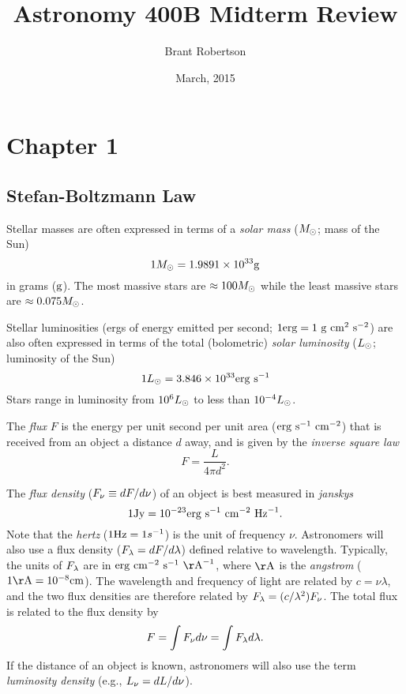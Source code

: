 \documentclass[]{article}
\title{Astronomy 400B Midterm Review}
\author{Brant Robertson}
\date{March, 2015}
\begin{document}
\maketitle

\section{Chapter 1}

\subsection{Stefan-Boltzmann Law}

Stellar masses are often expressed in terms of a {\it solar mass} ($M_{\odot}$; mass of the Sun)
\begin{equation}
1M_{\odot} = 1.9891\times10^{33}\mathrm{g}
\end{equation}
\noindent
in grams ($\mathrm{g}$). The most massive stars are $\approx100M_{\odot}$ while the
least massive stars are $\approx0.075M_{\odot}$.

Stellar luminosities (ergs of energy emitted per second; $1\mathrm{erg} = 1~\mathrm{g}~\mathrm{cm}^{2}~\mathrm{s}^{-2}$) are also 
often expressed in terms of the total (bolometric) {\it solar luminosity} ($L_{\odot}$; luminosity of the Sun)
\begin{equation}
1L_{\odot} = 3.846\times10^{33} \mathrm{erg}~\mathrm{s}^{-1}
\end{equation}
\noindent
Stars range in luminosity from $10^{6}L_{\odot}$ to less than $10^{-4}L_{\odot}$.

The {\it flux} $F$ is the energy per unit second per unit area ($\mathrm{erg}~\mathrm{s}^{-1}~\mathrm{cm}^{-2}$)
that is received from an object a distance $d$ away, and is
given by the {\it inverse square law}
\begin{equation}
\label{eqn:inverse_square}
F = \frac{L}{4\pi d^{2}}.
\end{equation}
\noindent

The {\it flux density} ($F_{\nu} \equiv dF/d\nu$) of an object is best measured in {\it janskys}
\begin{equation}
1\mathrm{Jy} = 10^{-23} \mathrm{erg}~\mathrm{s}^{-1}~\mathrm{cm}^{-2}~\mathrm{Hz}^{-1}.
\end{equation}
\noindent
Note that the {\it hertz} ($1\mathrm{Hz} = 1 s^{-1}$) is the unit of frequency $\nu$.
Astronomers will also use a flux density ($F_{\lambda} = dF/d\lambda$) 
defined relative to wavelength. Typically, the units of $F_{\lambda}$
are in $\erg~\cm^{-2}~\s^{-1}~\Ang^{-1}$, where $\Ang$ is the {\it angstrom}
($1\Ang = 10^{-8}\cm$). The wavelength and frequency of light are related by
$c = \nu \lambda$, and the two flux densities are therefore 
related by $F_{\lambda} = (c/\lambda^2)F_{\nu}$.
The total flux is related to the flux density by
\begin{equation}
F = \int F_{\nu} d \nu = \int F_{\lambda} d\lambda.
\end{equation}
\noindent
If the distance of an object is known, astronomers will also use the term
{\it luminosity density} (e.g., $L_{\nu} = dL/d\nu$).
\end{document}
